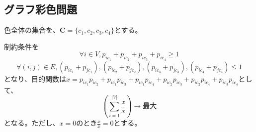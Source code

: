 \documentclass[a4paper,12pt]{jsarticle}
\begin{document}
\subsection{グラフ彩色問題}
色全体の集合を、$\bm{C}=\{c_1,c_2,c_3,c_4\}$とする。

制約条件を
\[\forall i \in V, p_{ic_1}+p_{ic_2}+p_{ic_3}+p_{ic_4}\geq  1\]
\[\forall (i,j)\in E, 
(p_{ic_1}+p_{jc_1}),
(p_{ic_2}+p_{jc_2}),
(p_{ic_3}+p_{jc_3}),
(p_{ic_4}+p_{jc_4})\leq 1\]
となり、目的関数は$x=
p_{ic_1}p_{ic_2}+
p_{ic_1}p_{ic_3}+
p_{ic_1}p_{ic_4}+
p_{ic_2}p_{ic_3}+
p_{ic_2}p_{ic_4}+
p_{ic_3}p_{ic_4}$として、
\[\left(\sum_{i = 1}^{|V|} \frac{x}{x}\right)\rightarrow 最大 \]
となる。ただし、$x=0のとき\frac{x}{x}=0とする。$
\end{document}
